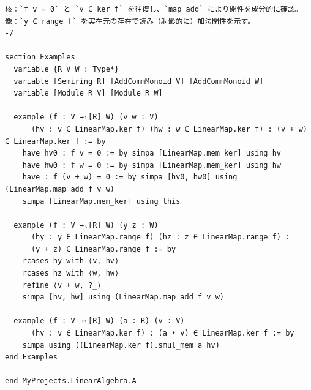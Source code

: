 \documentclass[12pt]{article}
\begin{document}
\begin{lstlisting}
核：`f v = 0` と `v ∈ ker f` を往復し、`map_add` により閉性を成分的に確認。
像：`y ∈ range f` を実在元の存在で読み（射影的に）加法閉性を示す。
-/

section Examples
  variable {R V W : Type*}
  variable [Semiring R] [AddCommMonoid V] [AddCommMonoid W]
  variable [Module R V] [Module R W]

  example (f : V →ₗ[R] W) (v w : V)
      (hv : v ∈ LinearMap.ker f) (hw : w ∈ LinearMap.ker f) : (v + w) ∈ LinearMap.ker f := by
    have hv0 : f v = 0 := by simpa [LinearMap.mem_ker] using hv
    have hw0 : f w = 0 := by simpa [LinearMap.mem_ker] using hw
    have : f (v + w) = 0 := by simpa [hv0, hw0] using (LinearMap.map_add f v w)
    simpa [LinearMap.mem_ker] using this

  example (f : V →ₗ[R] W) (y z : W)
      (hy : y ∈ LinearMap.range f) (hz : z ∈ LinearMap.range f) :
      (y + z) ∈ LinearMap.range f := by
    rcases hy with ⟨v, hv⟩
    rcases hz with ⟨w, hw⟩
    refine ⟨v + w, ?_⟩
    simpa [hv, hw] using (LinearMap.map_add f v w)

  example (f : V →ₗ[R] W) (a : R) (v : V)
      (hv : v ∈ LinearMap.ker f) : (a • v) ∈ LinearMap.ker f := by
    simpa using ((LinearMap.ker f).smul_mem a hv)
end Examples

end MyProjects.LinearAlgebra.A

\end{lstlisting}
\end{document}
